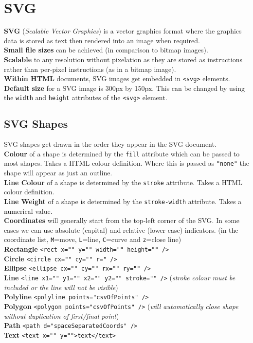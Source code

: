 \documentclass[a4paper,11pt]{article}
\begin{document}
\section{SVG}
\textbf{SVG} (\textit{Scalable Vector Graphics}) is a vector graphics format where the graphics data is stored as text then rendered into an image when required. \\
\textbf{Small file sizes} can be achieved (in comparison to bitmap images).\\
\textbf{Scalable} to any resolution without pixelation as they are stored as instructions rather than per-pixel instructions (as in a bitmap image).\\
\textbf{Within HTML} documents, SVG images get embedded in \verb|<svg>| elements.\\
\textbf{Default size} for a SVG image is 300px by 150px. This can be changed by using the \verb|width| and \verb|height| attributes of the \verb|<svg>| element.
\subsection{SVG Shapes}
SVG shapes get drawn in the order they appear in the SVG document.\\
\textbf{Colour} of a shape is determined by the \verb|fill| attribute which can be passed to most shapes. Takes a HTML colour definition. Where this is passed as \verb|"none"| the shape will appear as just an outline.\\
\textbf{Line Colour} of a shape is determined by the \verb|stroke| attribute. Takes a HTML colour definition.\\
\textbf{Line Weight} of a shape is determined by the \verb|stroke-width| attribute. Takes a numerical value.\\
\textbf{Coordinates} will generally start from the top-left corner of the SVG. In some cases we can use absolute (capital) and relative (lower case) indicators. (in the coordinate list, \verb|M|=move, \verb|L|=line, \verb|C|=curve and \verb|z|=close line)\\

\textbf{Rectangle} \verb|<rect x="" y="" width="" height="" />|\\
\textbf{Circle} \verb|<circle cx="" cy="" r=" />|\\
\textbf{Ellipse} \verb|<ellipse cx="" cy="" rx="" ry="" />|\\
\textbf{Line} \verb|<line x1="" y1="" x2="" y2="" stroke="" />| (\textit{stroke colour must be included or the line will not be visible})\\
\textbf{Polyline} \verb|<polyline points="csvOfPoints" />|\\
\textbf{Polygon} \verb|<polygon points="csvOfPoints" />| (\textit{will automatically close shape without duplication of first/final point})\\
\textbf{Path} \verb|<path d="spaceSeparatedCoords" />|\\
\textbf{Text} \verb|<text x="" y="">text</text>|
\end{document}
